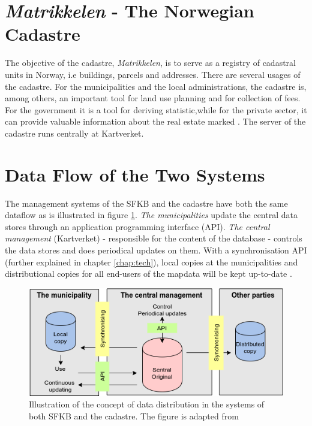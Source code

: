 
\section{\textit{Matrikkelen} - The Norwegian Cadastre}\label{cadastre}

The objective of the cadastre, \textit{Matrikkelen}, is to serve as a registry of cadastral units in Norway, i.e buildings, parcels and addresses. There are several usages of  the cadastre. For the municipalities and the local administrations, the cadastre is, among others, an important tool for land use planning and for collection of fees. For the government it is a tool for deriving statistic,while for the private sector, it can provide valuable information about the real estate marked \citep{Mjos2002}. The server of the cadastre runs centrally at Kartverket.  


\section{Data Flow of the Two Systems}
The management systems of the SFKB and the cadastre have both the same dataflow as is illustrated in figure \ref{fig:konsept}. \textit{The municipalities}  update the central data stores through an application programming interface (API). \textit{The central management} (Kartverket) 	- responsible for the content of the database - controls the data stores and does periodical updates on them. With a synchronisation API (further explained in chapter \ref{chap:tech}), local copies at the municipalities and distributional copies for all end-users of the mapdata will be kept up-to-date \citep{Kartverket2015}.


\begin{figure}[H]
	\centering
	\includegraphics[scale=0.8]{img/consept.png}
	\caption{Illustration of the concept of data distribution in the systems of both SFKB and the cadastre. The figure is adapted from \cite{Kartverket2015} }
	\label{fig:konsept}
\end{figure}


